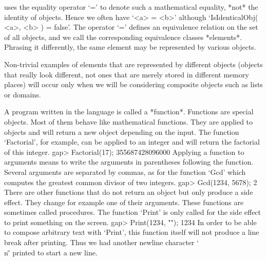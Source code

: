 {\GAP}   uses  the equality operator  `='  to  denote such a mathematical
equality, *not* the identity of objects. Hence we often  have `<a> = <b>'
although `IsIdenticalObj( <a>, <b> ) =  false'.  The operator `=' defines
an equivalence relation on the set of all {\GAP} objects, and we call the
corresponding  equivalence classes *elements*.   Phrasing it differently,
the same element may be represented by various {\GAP} objects.

Non-trivial examples of   elements   that are represented by    different
objects (objects  that really  look different,  not ones  that are merely
stored in  different  memory places)  will  occur only   when  we will be
considering composite objects such as lists or domains.

%


A  program  written  in  the  {\GAP} language  is  called  a  *function*.
Functions  are   special  {\GAP}  objects.   Most  of  them  behave  like
mathematical functions.  They are applied to  objects and  will return  a
new  object  depending  on  the input.   The  function  `Factorial',  for
example,  can be applied to an  integer and will  return the factorial of
this integer.
\beginexample
gap> Factorial(17);
355687428096000 
\endexample
Applying  a  function  to arguments  means  to  write  the  arguments  in
parentheses following the function.   Several arguments are  separated by
commas, as for the  function  `Gcd' which  computes  the greatest  common
divisor of two integers.
\beginexample
gap> Gcd(1234, 5678);
2 
\endexample
There are other functions that do not return an object but only produce a
side effect.   They change for  example  one of their  arguments.   These
functions are sometimes called  procedures.  The function `Print' is only
called for the side effect to print something on the screen.
\beginexample
gap> Print(1234, "\n");
1234 
\endexample
In order to be able to compose arbitrary text with `Print', this function
itself will not produce a line break  after printing. Thus we had another
newline character `\"\\n\"' printed to start a new line.

